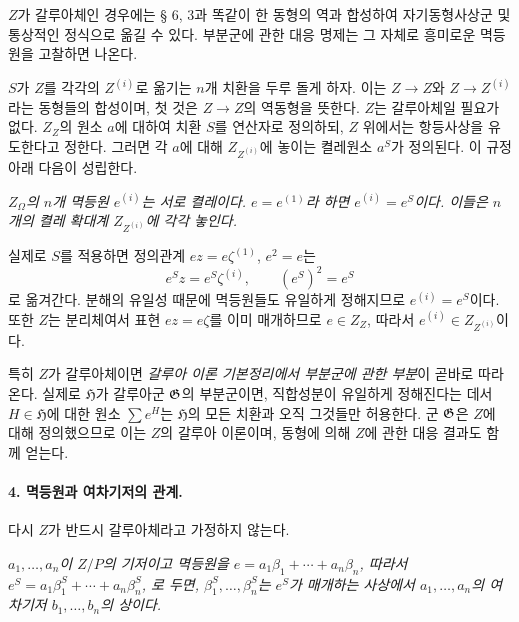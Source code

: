 \(Z\)가 갈루아체인 경우에는 § 6, 3과 똑같이 한 동형의 역과 합성하여 자기동형사상군 및 통상적인 정식으로 옮길 수 있다. 부분군에 관한 대응 명제는 그 자체로 흥미로운 멱등원을 고찰하면 나온다.

\medskip
\noindent\textbf{}\quad \(S\)가 \(Z\)를 각각의 \(Z^{(i)}\)로 옮기는 \(n\)개 치환을 두루 돌게 하자. 이는 \(Z\to Z\)와 \(Z\to Z^{(i)}\)라는 동형들의 합성이며, 첫 것은 \(Z\to Z\)의 역동형을 뜻한다. \(Z\)는 갈루아체일 필요가 없다. \(Z_Z\)의 원소 \(a\)에 대하여 치환 \(S\)를 연산자로 정의하되, \(Z\) 위에서는 항등사상을 유도한다고 정한다. 그러면 각 \(a\)에 대해 \(Z_{Z^{(i)}}\)에 놓이는 켤레원소 \(a^S\)가 정의된다. 이 규정 아래 다음이 성립한다.

\noindent\textbf{} \emph{\(Z_\Omega\)의 \(n\)개 멱등원 \(e^{(i)}\)는 서로 켤레이다. \(e=e^{(1)}\)라 하면 \(e^{(i)}=e^S\)이다. 이들은 \(n\)개의 켤레 확대계 \(Z_{Z^{(i)}}\)에 각각 놓인다.}

실제로 \(S\)를 적용하면 정의관계 \(ez=e\zeta^{(1)}\), \(e^2=e\)는
\[
e^Sz=e^S\zeta^{(i)},\qquad(e^S)^2=e^S
\]
로 옮겨간다. 분해의 유일성 때문에 멱등원들도 유일하게 정해지므로 \(e^{(i)}=e^S\)이다. 또한 \(Z\)는 분리체여서 표현 \(ez=e\zeta\)를 이미 매개하므로 \(e\in Z_Z\), 따라서 \(e^{(i)}\in Z_{Z^{(i)}}\)이다.

특히 \(Z\)가 갈루아체이면 \emph{갈루아 이론 기본정리에서 부분군에 관한 부분}이 곧바로 따라온다. 실제로 \(\mathfrak H\)가 갈루아군 \(\mathfrak G\)의 부분군이면, 직합성분이 유일하게 정해진다는 데서 \(H\in\mathfrak H\)에 대한 원소 \(\sum e^H\)는 \(\mathfrak H\)의 모든 치환과 오직 그것들만 허용한다. 군 \(\mathfrak G\)은 \(Z\)에 대해 정의했으므로 이는 \(Z\)의 갈루아 이론이며, 동형에 의해 \(Z\)에 관한 대응 결과도 함께 얻는다.

\paragraph{4. 멱등원과 여차기저의 관계.}
다시 \(Z\)가 반드시 갈루아체라고 가정하지 않는다.

\noindent\textbf{} \emph{\(a_1,\ldots,a_n\)이 \(Z/P\)의 기저이고 멱등원을 \(e=a_1\beta_1+\cdots+a_n\beta_n\), 따라서 \(e^S=a_1\beta_1^S+\cdots+a_n\beta_n^S\), 로 두면, \(\beta_1^S,\ldots,\beta_n^S\)는 \(e^S\)가 매개하는 사상에서 \(a_1,\ldots,a_n\)의 여차기저 \(b_1,\ldots,b_n\)의 상이다.}

